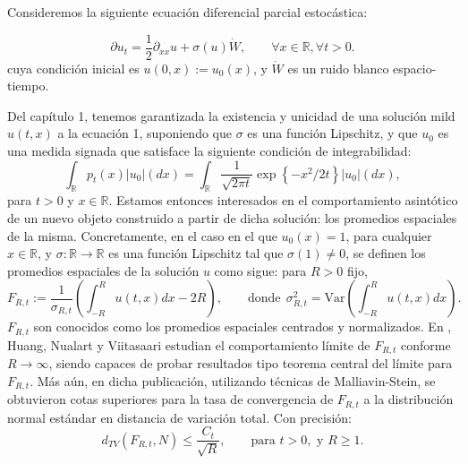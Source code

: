 \documentclass[letterpaper,twoside,12pt]{book}
\newcommand{\R}{\mathbb{R}}
\newcommand{\1}{\mathds{1}}
\newcommand{\abs}[1]{\left\lvert #1 \right\rvert}
\renewcommand{\to}{\rightarrow}
\theoremstyle{definition}
\theoremstyle{definition}
\theoremstyle{definition}
\theoremstyle{definition}
\theoremstyle{definition}
\theoremstyle{definition}
\theoremstyle{definition}
\begin{document}
Consideremos la siguiente ecuación diferencial parcial estocástica:

\begin{equation}
\partial u_t=\frac{1}{2}\partial_{xx}u+\sigma(u)\dot{W}, \qquad \forall x\in \R, \forall t>0.
\end{equation}
cuya condición inicial es $u(0,x):=u_0(x)$, y $\dot{W}$ es un ruido blanco espacio-tiempo.

Del capítulo 1, tenemos garantizada la existencia y unicidad de una solución mild $u(t,x)$ a la ecuación 1, suponiendo que $\sigma$ es una función Lipschitz, y que $u_0$ es una medida signada que satisface la siguiente condición de integrabilidad:
\[
\int_\R p_t(x)\abs{u_0}(dx)=\int_\R\frac{1}{\sqrt{2\pi t}}\exp \left\{-x^2/2t\right\}\abs{u_0}(dx),    
\]
para $t>0$ y $x\in \R$. Estamos entonces interesados en el comportamiento asintótico de un nuevo objeto construido a partir de dicha solución: los promedios espaciales de la misma. Concretamente, en el caso en el que $u_0(x)=1$, para cualquier $x\in \R$, y $\sigma:\R\to\R$ es una función Lipschitz tal que $\sigma(1)\neq 0$, se definen los promedios espaciales de la solución $u$ como sigue: para $R>0$ fijo, 
\begin{equation}
    F_{R,t}:=\frac{1}{\sigma_{R,t}}\left(\int_{-R}^{R}u(t,x)dx -2R\right), \qquad \text{donde} \ \ \sigma^2_{R,t}=\text{Var}\left(\int_{-R}^{R}u(t,x)dx\right).
\end{equation}
$F_{R,t}$ son conocidos como los promedios espaciales centrados y normalizados. En \cite{HUANG20207170}, Huang, Nualart y Viitasaari estudian el comportamiento límite de $F_{R,t}$ conforme $R\to \infty$, siendo capaces de probar resultados tipo teorema central del límite para $F_{R,t}$. Más aún, en dicha publicación, utilizando técnicas de Malliavin-Stein, se obtuvieron cotas superiores para la tasa de convergencia de $F_{R,t}$ a la distribución normal estándar en distancia de variación total. Con precisión:
\begin{equation}
    d_{TV}(F_{R,t},N)\leq \frac{C_t}{\sqrt{R}}, \qquad \text{para }t>0,\text{ y } R\geq1.  
\end{equation}
\end{document}
